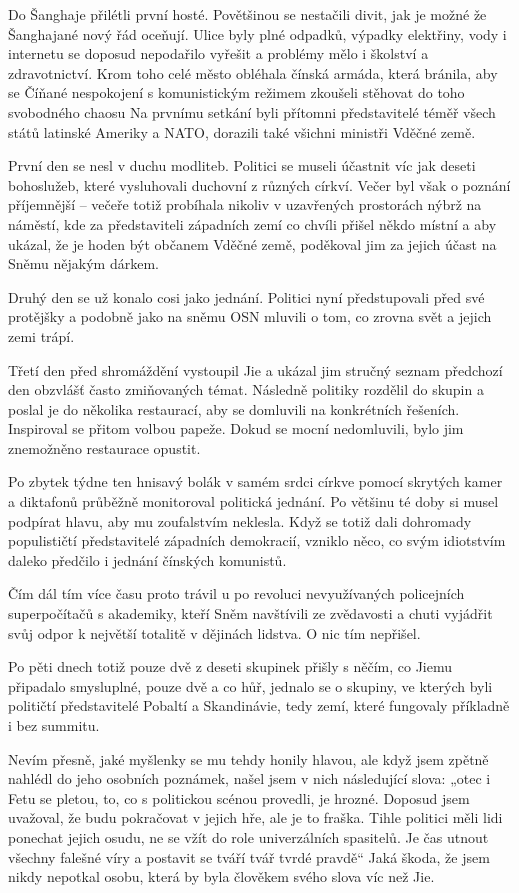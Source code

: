 Do Šanghaje přilétli první hosté. Povětšinou se nestačili divit, jak je možné že Šanghajané nový řád oceňují. Ulice byly plné odpadků, výpadky elektřiny, vody i internetu se doposud nepodařilo vyřešit a problémy mělo i školství a zdravotnictví. Krom toho celé město obléhala čínská armáda, která bránila, aby se Číňané nespokojení s komunistickým režimem zkoušeli stěhovat do toho svobodného chaosu Na prvnímu setkání byli přítomni představitelé téměř všech států latinské Ameriky a NATO, dorazili také všichni ministři Vděčné země. 

První den se nesl v duchu modliteb. Politici se museli účastnit víc jak deseti bohoslužeb, které vysluhovali duchovní z různých církví. Večer byl však o poznání příjemnější – večeře totiž probíhala nikoliv v uzavřených prostorách nýbrž na náměstí, kde za představiteli západních zemí co chvíli přišel někdo místní a aby ukázal, že je hoden být občanem Vděčné země, poděkoval jim za jejich účast na Sněmu nějakým dárkem.

Druhý den se už konalo cosi jako jednání. Politici nyní předstupovali před své protějšky a podobně jako na sněmu OSN mluvili o tom, co zrovna svět a jejich zemi trápí.

Třetí den před shromáždění vystoupil Jie a ukázal jim stručný seznam předchozí den obzvlášť často zmiňovaných témat. Následně politiky rozdělil do skupin a poslal je do několika restaurací, aby se domluvili na konkrétních řešeních. Inspiroval se přitom volbou papeže. Dokud se mocní nedomluvili, bylo jim znemožněno restaurace opustit. 

Po zbytek týdne ten hnisavý bolák v samém srdci církve pomocí skrytých kamer a diktafonů průběžně monitoroval politická jednání. Po většinu té doby si musel podpírat hlavu, aby mu zoufalstvím neklesla. Když se totiž dali dohromady populističtí představitelé západních demokracií, vzniklo něco, co svým idiotstvím daleko předčilo i jednání čínských komunistů.

Čím dál tím více času proto trávil u po revoluci nevyužívaných policejních superpočítačů s akademiky, kteří Sněm navštívili ze zvědavosti a chuti vyjádřit svůj odpor k největší totalitě v dějinách lidstva. O nic tím nepřišel.

Po pěti dnech totiž pouze dvě z deseti skupinek přišly s něčím, co Jiemu připadalo smysluplné, pouze dvě a co hůř, jednalo se o skupiny, ve kterých byli političtí představitelé Pobaltí a Skandinávie, tedy zemí, které fungovaly příkladně i bez summitu.

Nevím přesně, jaké myšlenky se mu tehdy honily hlavou, ale když jsem zpětně nahlédl do jeho osobních poznámek, našel jsem v nich následující slova: „otec i Fetu se pletou, to, co s politickou scénou provedli, je hrozné. Doposud jsem uvažoval, že budu pokračovat v jejich hře, ale je to fraška. Tihle politici měli lidi ponechat jejich osudu, ne se vžít do role univerzálních spasitelů. Je čas utnout všechny falešné víry a postavit se tváří tvář tvrdé pravdě“ Jaká škoda, že jsem nikdy nepotkal osobu, která by byla člověkem svého slova víc než Jie.

